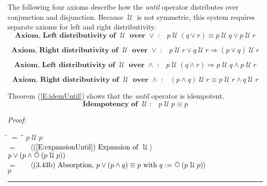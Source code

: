 \documentclass[12pt, fleqn, leqno]{article}
\newcommand{\lgap}{2pt}                             %
\newcommand{\mymathindent}{24pt}                    %
\newcommand{\impl}{\ensuremath{\Rightarrow}}        %
\newcommand{\Until}{\;\mathcal{U}\;}
\newcommand{\Next}{\;\,\text{\raisebox{3.5pt}{\circle{6}}}}
\newcommand{\myqed}{\rule[-.23ex]{1.2ex}{2.0ex}}
\newcommand{\myqedtab}{\hspace{384pt}}              %
\newcommand{\firstspacer}{\vspace{-26pt}}
\newcommand{\Gll} {\langle}                         %
\newcommand{\Ggg} {\rangle}                         %
\newcommand{\Hint}[1]     {\ \ \ $\Gll              \mbox{#1} \Ggg$ }   %
\begin{document}
The following four axioms describe how the \textit{until} operator distributes over conjunction and disjunction.
Because $\Until$ is not symmetric, this system requires separate axioms for left and right distributivity.
\begin{equation}\label{E:untilOrEquiv}
\textbf{Axiom, Left distributivity of $\Until$ over $\lor$ :}\quad p \Until (q \lor r) \equiv p \Until q \lor p \Until r
\end{equation}

\firstspacer

\begin{equation}\label{E:untilOrImp}
\textbf{Axiom, Right distributivity of $\Until$ over $\lor$ :}\quad p \Until r \lor q \Until r \impl (p \lor q) \Until r
\end{equation}

\firstspacer

\begin{equation}\label{E:untilAndImp}
\textbf{Axiom, Left distributivity of $\Until$ over $\land$ :}\quad p \Until (q \land r) \impl p \Until q \land p \Until r
\end{equation}

\firstspacer

\begin{equation}\label{E:untilAndEquiv}
\textbf{Axiom, Right distributivity of $\Until$ over $\land$ :}\quad (p \land q) \Until r \equiv p \Until r \land q \Until r
\end{equation}

Theorem (\ref{E:idemUntil}) shows that the \textit{until} operator is idempotent.
\begin{equation}\label{E:idemUntil}
\textbf{Idempotency of $\Until$:}\quad p \Until p \equiv p
\end{equation}

\emph{Proof}:
\begin{tabbing}
\hspace{\mymathindent} \= $= \;$ \= \myqedtab \= \kill
  \> \>   $p \Until p$\\[\lgap]
  \> $=$  \>  \Hint{(\ref{E:expansionUntil}) Expansion of $\Until$}\\[\lgap]
  \> \>   $p \lor (p \land \Next(p \Until p))$\\[\lgap]
  \> $=$  \>  \Hint{(3.43b) Absorption, $p \lor (p \land q) \equiv p$ with $q := \Next (p \Until p)$}\\[\lgap]
  \> \>   $p$ \quad \myqed
\end{tabbing}
\end{document}
